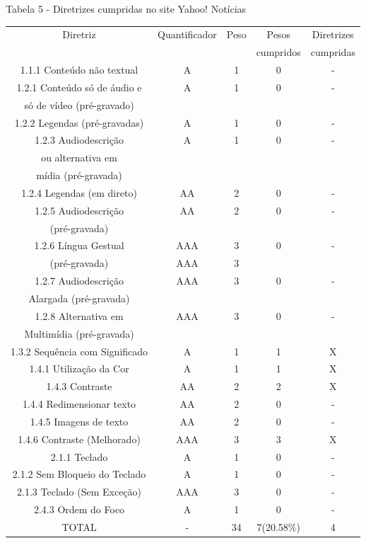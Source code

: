 \documentclass[a4paper]{article}
\begin{document}
\begin{titlepage}
Tabela 5 - Diretrizes cumpridas no site Yahoo! Notícias\\[-1cm]
\begin{center}
	\fontsize{8pt}{8pt}\selectfont	
	\begin{longtable}{|c|c|c|c|c|}
		\hline
		Diretriz & Quantificador & Peso & Pesos & Diretrizes\\
		& & & cumpridos & cumpridas\\
		\hline
		1.1.1 Conteúdo não textual & A & 1 & 0 & - \\
		\hline
		1.2.1 Conteúdo só de áudio e & A & 1 & 0 & - \\
		só de vídeo (pré-gravado) & & & & \\
		\hline
		1.2.2 Legendas (pré-gravadas) & A & 1 & 0 & - \\
		\hline
		1.2.3 Audiodescrição & A & 1 & 0 & - \\
		ou alternativa em & & & & \\
		mídia (pré-gravada) & & & & \\
		\hline
		1.2.4 Legendas (em direto) & AA & 2 & 0 & - \\
		\hline
		1.2.5 Audiodescrição & AA & 2 & 0 & - \\
		(pré-gravada) & & & & \\
		\hline
		1.2.6 Língua Gestual & AAA & 3 & 0 & - \\
		(pré-gravada) & AAA & 3 & & \\
		\hline
		1.2.7 Audiodescrição & AAA & 3 & 0 & - \\
		Alargada (pré-gravada) & & & & \\
		\hline
		1.2.8 Alternativa em & AAA & 3 & 0 & - \\
		Multimídia (pré-gravada) & & & & \\
		\hline
		1.3.2 Sequência com Significado & A & 1 & 1 & X \\
		\hline
		1.4.1 Utilização da Cor & A & 1 & 1 & X \\
		\hline
		1.4.3 Contraste & AA & 2 & 2 & X \\
		\hline
		1.4.4 Redimensionar texto & AA & 2 & 0 & - \\
		\hline
		1.4.5 Imagens de texto & AA & 2 & 0 & - \\
		\hline
		1.4.6 Contraste (Melhorado) & AAA & 3 & 3 & X \\
		\hline
		2.1.1 Teclado & A & 1 & 0 & - \\
		\hline
		2.1.2 Sem Bloqueio do Teclado & A & 1 & 0 & - \\
		\hline
		2.1.3 Teclado (Sem Exceção) & AAA & 3 & 0 & - \\
		\hline
		2.4.3 Ordem do Foco & A & 1 & 0 & - \\
		\hline
		TOTAL & - & 34 & 7(20.58\%) & 4 \\
		\hline
	\end{longtable}
\end{center}


\end{titlepage}
\end{document}

